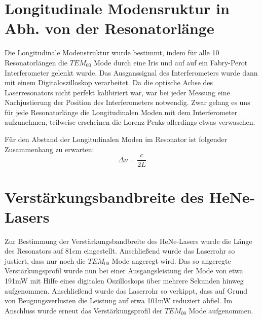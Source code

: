 \documentclass[bigchapter,colorback,accentcolor=tud4b,linedtoc,11pt]{tudreport}
\numberwithin{equation}{subsection}
\begin{document}
\FloatBarrier
\section{Longitudinale Modensruktur in Abh. von der Resonatorlänge}
Die Longitudinale Modenstruktur wurde bestimmt, indem für alle 10 Resonatorlängen die $TEM_{00}$ Mode durch eine Iris und auf auf ein Fabry-Perot Interferometer gelenkt wurde. Das Ausganssignal des Interferometers wurde dann mit einem Digitaloszilloskop verarbeitet.
Da die optische Achse des Laserresonators nicht perfekt kalibiriert war, war bei jeder Messung eine Nachjustierung der Position des Interferometers notwendig. Zwar gelang es uns für jede Resonatorlänge die Longitudinalen Moden mit dem Interferometer aufzunehmen, teilweise erscheinen die Lorenz-Peaks allerdings etwas verwaschen.

Für den Abstand der Longitudinalen Moden im Resonator ist folgender Zusammenhang zu erwarten:
$$\Delta\nu=\frac{c}{2L}$$
\FloatBarrier
\newpage
\section{Verstärkungsbandbreite des HeNe-Lasers}
Zur Bestimmung der Verstärkungsbandbreite des HeNe-Lasers wurde die Länge des Resonators auf 81cm eingestellt. Anschließend wurde das Laserrohr so justiert, dass nur noch die $TEM_{00}$ Mode angeregt wird. Das so angeregte Verstärkungsprofil wurde nun bei einer Ausgangsleistung der Mode von etwa 191mW mit Hilfe eines digitalen Oszilloskops über mehrere Sekunden hinweg aufgenommen. Anschließend wurde das Laserrohr so verkippt, dass auf Grund von Beugungsverlusten die Leistung auf etwa 101mW reduziert abfiel. Im Anschluss wurde erneut das Verstärkungsprofil der $TEM_{00}$ Mode aufgenommen.
\end{document}

